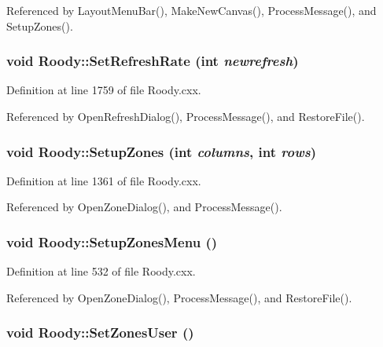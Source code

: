 Referenced by LayoutMenuBar(), MakeNewCanvas(), ProcessMessage(), and SetupZones().
\subsubsection[{SetRefreshRate}]{\setlength{\rightskip}{0pt plus 5cm}void Roody::SetRefreshRate (int {\em newrefresh})\hspace{0.3cm}{\ttfamily  [private]}}\label{classRoody_a2ee32c43e68c09115a14175364c1317c}


Definition at line 1759 of file Roody.cxx.

Referenced by OpenRefreshDialog(), ProcessMessage(), and RestoreFile().
\subsubsection[{SetupZones}]{\setlength{\rightskip}{0pt plus 5cm}void Roody::SetupZones (int {\em columns}, \/  int {\em rows})\hspace{0.3cm}{\ttfamily  [private]}}\label{classRoody_a60af242cf4f26d4c7107f5c0dabcb7f8}


Definition at line 1361 of file Roody.cxx.

Referenced by OpenZoneDialog(), and ProcessMessage().
\subsubsection[{SetupZonesMenu}]{\setlength{\rightskip}{0pt plus 5cm}void Roody::SetupZonesMenu ()\hspace{0.3cm}{\ttfamily  [private]}}\label{classRoody_aeab0c9ef7324094b3fe7c64dbd4cbea6}


Definition at line 532 of file Roody.cxx.

Referenced by OpenZoneDialog(), ProcessMessage(), and RestoreFile().
\subsubsection[{SetZonesUser}]{\setlength{\rightskip}{0pt plus 5cm}void Roody::SetZonesUser ()\hspace{0.3cm}{\ttfamily  [private]}}\label{classRoody_a50d150457e9811d87a7493b8557dc06a}


